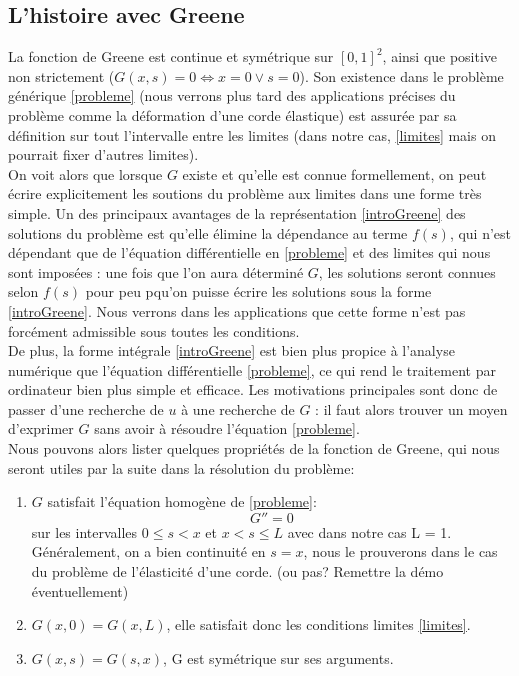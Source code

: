 \documentclass[12pt]{article}
\begin{document}
\subsection{L'histoire avec Greene}
\quad La fonction de Greene est continue et symétrique sur $[0,1]^2$, ainsi que positive non strictement ($G(x,s) = 0 \Longleftrightarrow x = 0 \lor s = 0$). Son existence dans le problème générique \eqref{probleme} (nous verrons plus tard des applications précises du problème comme la déformation d'une corde élastique) est assurée par sa définition sur tout l'intervalle entre les limites (dans notre cas, \eqref{limites} mais on pourrait fixer d'autres limites). \\
\quad On voit alors que lorsque $G$ existe et qu'elle est connue formellement, on peut écrire explicitement les soutions du problème aux limites dans une forme très simple.  Un des principaux avantages de la représentation \eqref{introGreene} des solutions du problème est qu'elle élimine la dépendance au terme $f(s)$, qui n'est dépendant que de l'équation différentielle en \eqref{probleme} et des limites qui nous sont imposées : une fois que l'on aura déterminé $G$, les solutions seront connues selon $f(s)$ pour peu pqu'on puisse écrire les solutions sous la forme \eqref{introGreene}. Nous verrons dans les applications que cette forme n'est pas forcément admissible sous toutes les conditions. \\
\quad De plus, la forme intégrale \eqref{introGreene} est bien plus propice à l'analyse numérique que l'équation différentielle \eqref{probleme}, ce qui rend le traitement par ordinateur bien plus simple et efficace. Les motivations principales sont donc de passer d'une recherche de $u$ à une recherche de $G$ : il faut alors trouver un moyen d'exprimer $G$ sans avoir à résoudre l'équation \eqref{probleme}.\\
Nous pouvons alors lister quelques propriétés de la fonction de Greene, qui nous seront utiles par la suite dans la résolution du problème:
\begin{enumerate}
  \item $G$ satisfait l'équation homogène de  \eqref{probleme}:
	\begin{equation}
		G'' = 0
	\end{equation}
	sur les intervalles $0 \le s < x$ et $x < s \le L$ avec dans notre cas L = 1. Généralement, on a bien continuité en $s = x$, nous le prouverons dans le cas du problème de l'élasticité d'une corde. (ou pas? Remettre la démo éventuellement)
  \item $G(x, 0) = G(x, L)$, elle satisfait donc les conditions limites \eqref{limites}.
  \item $G(x,s) = G(s, x)$, G est symétrique sur ses arguments.
\end{enumerate}
\end{document}
